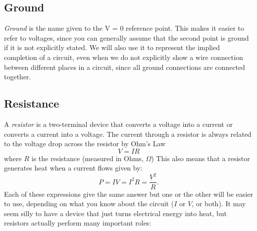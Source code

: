 \documentclass{article}
\begin{document}
\subsection{Ground}
\emph{Ground} is the name given to the V = 0 reference point. This makes it easier to refer to voltages, since you can generally assume that the second point is ground if it is not explicitly stated. We will also use it to represent the implied completion of a circuit, even when we do not explicitly show a wire connection between different places in a circuit, since all ground connections are connected together.

\subsection{Resistance}
A \emph{resistor} is a two-terminal device that converts a voltage into a current or converts a current into a voltage. The current through a resistor is always related to the voltage drop across the resistor by Ohm's Law
\begin{equation}
V = IR
\end{equation}
where $R$ is the resistance (measured in Ohms, $\Omega$) This also means that a resistor generates heat when a current flows given by:
\begin{equation}
 P = IV = I^2 R = \frac{V^2}{R}.
\end{equation}
Each of these expressions give the same answer but one or the other will be easier to use, depending on what you know about the circuit ($I$ or $V$, or both). It may seem silly to have a device that just turns electrical energy into heat, but resistors actually perform many important roles:
\end{document}
